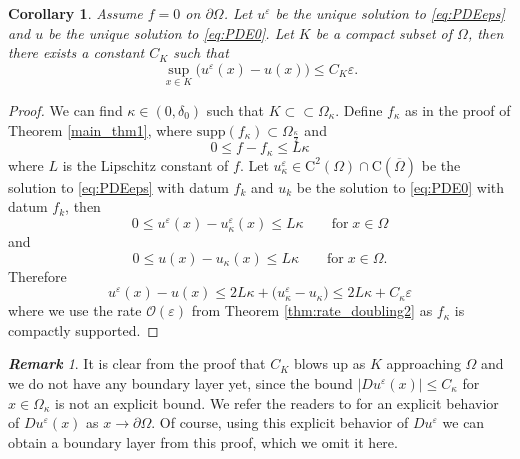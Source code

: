\documentclass[12pt,reqno]{amsart}
\numberwithin{figure}{section}
\theoremstyle{plain}
\newtheorem{cor}[thm]{Corollary}
\theoremstyle{remark}
\newtheorem{rem}{\bf{Remark}}
\numberwithin{equation}{section}
\newcommand{\rmC}{\mathrm{C}}
\begin{document}
\begin{cor} Assume $f = 0$ on $\partial\Omega$. Let $u^\varepsilon$ be the unique solution to \eqref{eq:PDEeps} and $u$ be the unique solution to \eqref{eq:PDE0}. Let $K$ be a compact subset of $\Omega$, then there exists a constant $C_K$ such that 
\begin{equation*}
    \sup_{x\in K} \big(u^\varepsilon(x) -u(x)\big) \leq C_K\varepsilon.
\end{equation*}
\end{cor}
\begin{proof} We can find $\kappa\in \left(0,\delta_0\right)$ such that $K\subset\subset \Omega_{\kappa}$. Define $f_\kappa$ as in the proof of Theorem \ref{main_thm1}, where $\mathrm{supp}(f_\kappa)\subset\Omega_{\frac{\kappa}{2}}$ and
\begin{equation*}
    0\leq f - f_\kappa \leq L\kappa
\end{equation*}
where $L$ is the Lipschitz constant of $f$. Let $u^\varepsilon_\kappa\in \rmC^2(\Omega)\cap \rmC(\overline{\Omega})$ be the solution to \eqref{eq:PDEeps} with datum $f_k$ and $u_k$ be the solution to \eqref{eq:PDE0} with datum $f_k$, then
\begin{equation*}
  0\leq u^\varepsilon(x) - u^\varepsilon_\kappa(x)\leq L\kappa \qquad\text{for}\;x\in \Omega
\end{equation*}
and
\begin{equation*}
    0\leq u(x) - u_\kappa(x)\leq L\kappa \qquad\text{for}\;x\in \Omega.
\end{equation*}
Therefore
\begin{equation*}
    u^\varepsilon(x)-u(x)\leq 2L\kappa + \big(u^\varepsilon_\kappa - u_\kappa\big) \leq 2L\kappa+C_{\kappa}\varepsilon
\end{equation*}
where we use the rate $\mathcal{O}(\varepsilon)$ from Theorem \ref{thm:rate_doubling2} as $f_\kappa$ is compactly supported. 
\end{proof}


\begin{rem} It is clear from the proof that $C_K$ blows up as $K$ approaching $\Omega$ and we do not have any boundary layer yet, since the bound $|Du^\varepsilon(x)|\leq C_\kappa$ for $x\in \Omega_\kappa$ is not an explicit bound. We refer the readers to \cite{alessio_asymptotic_2006} for an explicit behavior of $Du^\varepsilon(x)$ as $x\to \partial \Omega$. Of course, using this explicit behavior of $Du^\varepsilon$ we can obtain a boundary layer from this proof, which we omit it here.
\end{rem}
\end{document}
